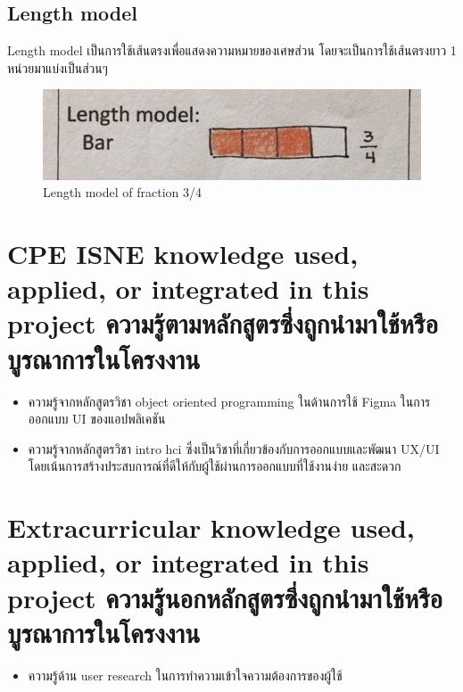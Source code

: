 \subsection{Length model}
Length model เป็นการใช้เส้นตรงเพื่อแสดงความหมายของเศษส่วน โดยจะเป็นการใช้เส้นตรงยาว 1 หน่วยมาแบ่งเป็นส่วนๆ
\begin{figure}[h!tbp]
\begin{center}
\includegraphics{Length_model.png}
\end{center}
\caption[Length model]{Length model of fraction 3/4 \cite{ejmste}}
\end{figure}




\section{\ifenglish%
\ifcpe CPE \else ISNE \fi knowledge used, applied, or integrated in this project
\else%
ความรู้ตามหลักสูตรซึ่งถูกนำมาใช้หรือบูรณาการในโครงงาน
\fi
}

\begin{itemize}
    \item ความรู้จากหลักสูตรวิชา object oriented programming ในด้านการใช้ Figma ในการออกแบบ UI ของแอปพลิเคชัน
    \item ความรู้จากหลักสูตรวิชา intro hci ซึ่งเป็นวิชาที่เกี่ยวข้องกับการออกแบบและพัฒนา UX/UI โดยเน้นการสร้างประสบการณ์ที่ดีให้กับผู้ใช้ผ่านการออกแบบที่ใช้งานง่าย และสะดวก
\end{itemize}

\section{\ifenglish%
Extracurricular knowledge used, applied, or integrated in this project
\else%
ความรู้นอกหลักสูตรซึ่งถูกนำมาใช้หรือบูรณาการในโครงงาน
\fi
}

\begin{itemize}
    \item ความรู้ด้าน user research ในการทำความเข้าใจความต้องการของผู้ใช้
\end{itemize}
